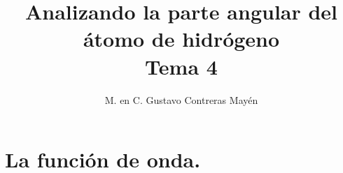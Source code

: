 

\title{Analizando la parte angular del átomo de hidrógeno \\ {\large Tema 4}\vspace{-3ex}}
\author{M. en C. Gustavo Contreras Mayén}
\date{ }

\pagestyle{fancy}
\fancyhf{}
\lhead{\leftmark}
\rfoot{\thepage}
\setlength{\headheight}{16pt}%

\def\changemargin#1#2{\list{}{\rightmargin#2\leftmargin#1}\item[]}
\let\endchangemargin=\endlist 



\maketitle
\fontsize{14}{14}\selectfont
\tableofcontents
\newpage

\section{La función de onda.}

